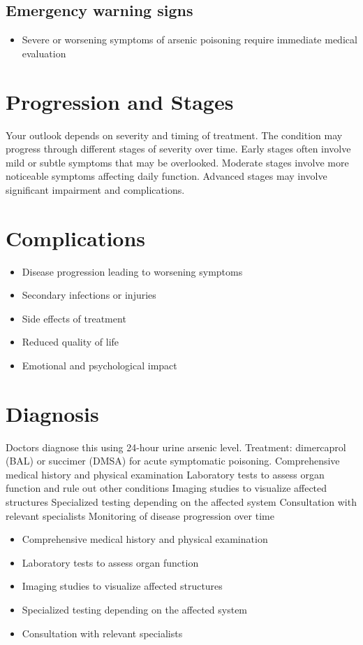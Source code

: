 \subsection{Emergency warning signs}
\begin{itemize}[noitemsep]
  \item Severe or worsening symptoms of arsenic poisoning require immediate medical evaluation
\end{itemize}
\section{Progression and Stages}
Your outlook depends on severity and timing of treatment. The condition may progress through different stages of severity over time. Early stages often involve mild or subtle symptoms that may be overlooked. Moderate stages involve more noticeable symptoms affecting daily function. Advanced stages may involve significant impairment and complications.
\section{Complications}
\begin{itemize}[noitemsep]
  \item Disease progression leading to worsening symptoms
  \item Secondary infections or injuries
  \item Side effects of treatment
  \item Reduced quality of life
  \item Emotional and psychological impact
\end{itemize}
\section{Diagnosis}
Doctors diagnose this using 24-hour urine arsenic level. Treatment: dimercaprol (BAL) or succimer (DMSA) for acute symptomatic poisoning. Comprehensive medical history and physical examination Laboratory tests to assess organ function and rule out other conditions Imaging studies to visualize affected structures Specialized testing depending on the affected system Consultation with relevant specialists Monitoring of disease progression over time

\begin{itemize}[noitemsep]
  \item Comprehensive medical history and physical examination
  \item Laboratory tests to assess organ function
  \item Imaging studies to visualize affected structures
  \item Specialized testing depending on the affected system
  \item Consultation with relevant specialists
\end{itemize}
